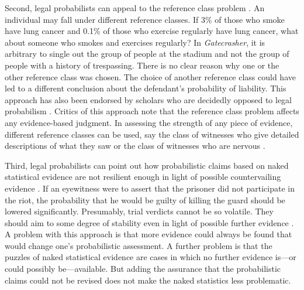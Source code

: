 \documentclass{article}
\begin{document}
Second, legal probabilists can appeal to the reference class problem \citep{colyvan2001crime}.
An individual may fall under different reference classes. If 3\% of those who smoke have lung cancer and 0.1\% of those who exercise regularly have lung cancer, what  about someone who smokes and exercises regularly? In \textit{Gatecrasher}, it is arbitrary to  single out the group of people at the stadium and not the group of people with a history of trespassing. There is no clear reason why one or the other reference class was chosen. %
The choice of another reference class could have led to a different conclusion about the defendant's probability of liability.
This approach has also been endorsed by 
scholars who are decidedly opposed to legal probabilism \citep{allen2007problematic}.
Critics of this approach note that the reference class problem affects any evidence-based judgment. In assessing the strength of any piece of evidence, different reference classes can be used, say the class of witnesses who give detailed descriptions of what they saw or the class of witnesses who are nervous \citep{redmayne2008exploring}. 

 
 Third, legal probabilists can point out how probabilistic claims based on naked statistical evidence are not resilient enough in light of possible countervailing evidence \citep[on the notion of resilience and stability of belief, see][]{Skyrms1980, leitgeb2014}. 
  If an eyewitness were to assert that the prisoner did not participate in the riot, the probability that he would be guilty of killing the guard should be lowered significantly. Presumably, trial verdicts cannot be so volatile. They should aim to some degree of stability even in light of possible further evidence \citep{bolinger2020}.  
A problem with this approach is that more evidence could always be found that would change one's probabilistic assessment.
A further problem is that the puzzles of naked statistical evidence are cases in which no further evidence is---or could possibly be---available. But adding the assurance that the probabilistic claims could not be revised does not make the naked statistics less problematic. 
 
 
\end{document}
